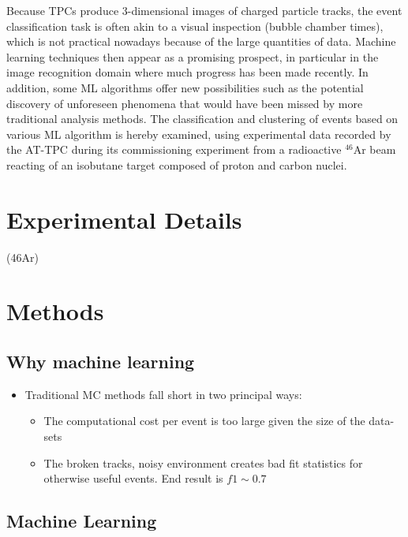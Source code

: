 \documentclass[preprint,12pt]{elsarticle}
\begin{document}
Because TPCs produce 3-dimensional images of charged particle tracks, the event classification task is often akin to a visual inspection (bubble chamber times), which is not practical nowadays because of the large quantities of data. Machine learning techniques then appear as a promising prospect, in particular in the image recognition domain where much progress has been made recently. In addition, some ML algorithms offer new possibilities such as the potential discovery of unforeseen phenomena that would have been missed by more traditional analysis methods. The classification and clustering of events based on various ML algorithm is hereby examined, using experimental data recorded by the AT-TPC during its commissioning experiment from a radioactive $^{46}$Ar beam reacting of an isobutane target composed of proton and carbon nuclei. 

\section{Experimental Details} 
(46Ar)
\section{Methods}\label{sec:methods}
\subsection{Why machine learning}

\begin{itemize}
    \item Traditional MC methods fall short in two principal ways:
    \begin{itemize}
        \item The computational cost per event is too large given the size of the data-sets
        \item The broken tracks, noisy environment creates bad fit statistics for otherwise useful events. End result is $f1 \sim 0.7 $
    \end{itemize}
\end{itemize}

\subsection{Machine Learning}
\end{document}
